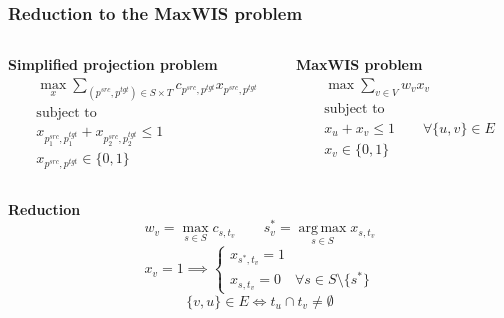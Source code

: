 \documentclass{beamer}
\newcommand{\src}[1]{#1^{src}}
\newcommand{\tgt}[1]{#1^{tgt}}
\DeclareMathOperator*{\argmax}{arg\,max}
\begin{document}
\begin{frame}
  \frametitle{Reduction to the MaxWIS problem}
  \begin{columns}
    \begin{column}[t]{.5\textwidth}
      \centering\textbf{Simplified projection problem}
      \begin{align*}
        & \max\limits_x \sum\limits_{(\src{p}, \tgt{p}) \in S \times T} c_{\src{p}, \tgt{p}} x_{\src{p}, \tgt{p}}                                             \\
        & \text{subject to}                                                                                                                                   \\
        & x_{\src{p_1}, \tgt{p_1}} + x_{\src{p_2}, \tgt{p_2}} \leq 1\\
        & x_{\src{p}, \tgt{p}} \in \{ 0, 1 \}
      \end{align*}
    \end{column}
    \begin{column}[t]{.5\textwidth}
      \centering\textbf{MaxWIS problem}
      \begin{align*}
        & \max \sum\limits_{v \in V} w_v x_v                               \\
        & \text{subject to} \\
        & x_u + x_v \leq 1               \qquad \forall \{u, v\} \in E \\
        & x_v \in \{0, 1\}
      \end{align*}
    \end{column}
  \end{columns}

  \centering\textbf{Reduction}
  \[
    w_v = \max\limits_{s \in S} c_{s, t_v} \qquad s^*_v = \argmax\limits_{s \in S} x_{s, t_v}
  \]
  \[
    x_v = 1 \implies
    \begin{cases}
      x_{s^*, t_v} = 1 \\
      x_{s, t_v} = 0 \quad \forall s \in S \setminus \{ s^* \}
    \end{cases}
  \]
  \[
    \{ v, u \} \in E \Leftrightarrow t_u \cap t_v \neq \emptyset
  \]
\end{frame}
\end{document}
